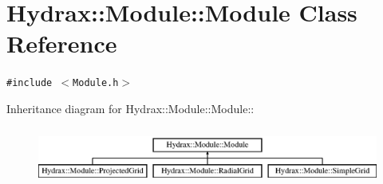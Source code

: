 \hypertarget{class_hydrax_1_1_module_1_1_module}{
\section{Hydrax::Module::Module Class Reference}
\label{class_hydrax_1_1_module_1_1_module}
}
{\tt \#include $<$Module.h$>$}

Inheritance diagram for Hydrax::Module::Module::\begin{figure}[H]
\begin{center}
\leavevmode
\includegraphics[height=1.93437cm]{class_hydrax_1_1_module_1_1_module}
\end{center}
\end{figure}
